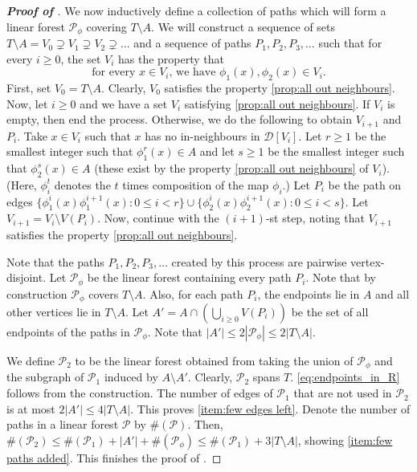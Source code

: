 \documentclass[10pt,a4paper,reqno]{amsart}
\begin{document}
\begin{proof}[\textbf{Proof of }]
We now inductively define a collection of paths which will form a linear forest $\mathcal{P}_{\phi}$ covering $T\setminus A$. We will construct a sequence of sets $T\setminus A = V_0 \supsetneq V_1 \supsetneq V_2 \supsetneq \ldots$ and a sequence of paths $P_1,P_2,P_3,\ldots$ such that for every $i\ge 0$, the set $V_i$ has the property that 
\begin{equation}\label{prop:all out neighbours}
\text{for every $x\in V_i$, we have $\phi_1(x), \phi_2(x)\in V_i$.}
\end{equation}
First, set $V_0 = T \setminus A$. Clearly, $V_0$ satisfies the property \eqref{prop:all out neighbours}. Now, let $i \ge 0$ and we have a set $V_i$ satisfying \eqref{prop:all out neighbours}. If $V_i$ is empty, then end the process. Otherwise, we do the following to obtain $V_{i+1}$ and $P_i$.  Take $x \in V_i$ such that $x$ has no in-neighbours in $\mathcal{D}[V_i]$. Let $r \ge 1$ be the smallest integer such that $\phi_1^r(x) \in A$ and let $s\ge 1$ be the smallest integer such that $\phi_2^s(x) \in A$ (these exist by the property \eqref{prop:all out neighbours} of $V_i$). (Here, $\phi_i^t$ denotes the $t$ times composition of the map $\phi_i$.) Let  $P_i$ be the path on edges $\{\phi_1^i(x)\phi_1^{i+1}(x): 0\le i < r\}\cup \{\phi_2^i(x)\phi_2^{i+1}(x) : 0\le i < s\} $. Let $V_{i+1} = V_i\setminus V(P_i)$. Now, continue with the $(i+1)$-st step, noting that $V_{i+1}$ satisfies the property \eqref{prop:all out neighbours}.

Note that the paths $P_1,P_2,P_3,\ldots$ created by this process are pairwise vertex-disjoint. Let $\mathcal{P}_{\phi}$ be the linear forest containing every path $P_i$. Note that by construction $\mathcal{P}_{\phi}$ covers $T\setminus A$. Also, for each path $P_i$, the endpoints lie in $A$ and all other vertices lie in $T\setminus A$. Let $A' = A\cap (\bigcup_{i\ge 0}V(P_i))$ be the set of all endpoints of the paths in $\mathcal{P}_{\phi}$. Note that $|A'| \le 2|\mathcal{P}_\phi| \le 2|T\setminus A|$. 

We define $\mathcal{P}_2$ to be the linear forest obtained from taking the union of $\mathcal{P}_{\phi}$ and the subgraph of $\mathcal{P}_1$ induced by $A \setminus A'$. Clearly, $\mathcal{P}_2$ spans $T$.
\ref{eq:endpoints_in_R} follows from the construction.
The number of edges of  $\mathcal{P}_1$ that are not used in $\mathcal{P}_2$ is at most $2|A'| \le 4 |T \setminus A|$. This proves \ref{item:few edges left}. Denote the number of paths in a linear forest $\mathcal{P}$ by $\#(\mathcal{P})$. Then, $\#(\mathcal{P}_2) \le \#(\mathcal{P}_1)+|A'| + \#(\mathcal{P}_{\phi}) \le \#(\mathcal{P}_1) + 3|T\setminus A|$, showing \ref{item:few paths added}. This finishes the proof of .
\end{proof}
\end{document}
